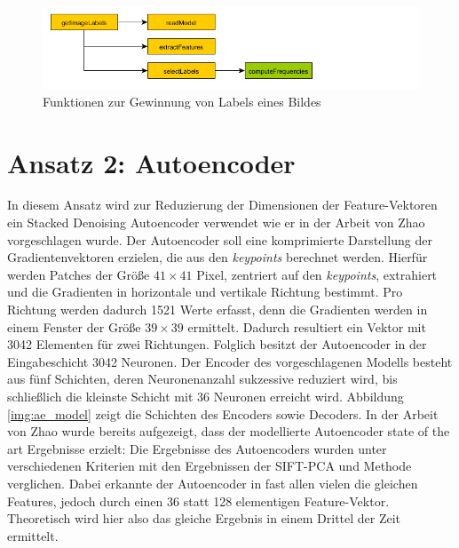 \begin{figure}
	\centering
	\includegraphics[scale=0.8]{images/concept_bovw_2.png}
	\caption{Funktionen zur Gewinnung von Labels eines Bildes}
	\label{img:concept_bovw_2}
\end{figure}

\section{Ansatz 2: Autoencoder}

In diesem Ansatz wird zur Reduzierung der Dimensionen der Feature-Vektoren ein Stacked Denoising Autoencoder verwendet wie er in der Arbeit von Zhao \cite{aed2016} vorgeschlagen wurde. Der Autoencoder soll eine komprimierte Darstellung der Gradientenvektoren erzielen, die aus den \textit{keypoints} berechnet werden. Hierfür werden Patches der Größe $41 \times 41$ Pixel, zentriert auf den \textit{keypoints}, extrahiert und die Gradienten in horizontale und vertikale Richtung bestimmt. Pro Richtung werden dadurch 1521 Werte erfasst, denn die Gradienten werden in einem Fenster der Größe $39 \times 39$ ermittelt. Dadurch resultiert ein Vektor mit 3042 Elementen für zwei Richtungen. Folglich besitzt der Autoencoder in der Eingabeschicht 3042 Neuronen. Der Encoder des vorgeschlagenen Modells besteht aus fünf Schichten, deren Neuronenanzahl sukzessive reduziert wird, bis schließlich die kleinste Schicht mit 36 Neuronen erreicht wird. Abbildung \ref{img:ae_model} zeigt die Schichten des Encoders sowie Decoders. In der Arbeit von Zhao wurde bereits aufgezeigt, dass der modellierte Autoencoder state of the art Ergebnisse erzielt: Die Ergebnisse des Autoencoders wurden unter verschiedenen Kriterien mit den Ergebnissen der SIFT-PCA und  Methode verglichen. Dabei erkannte der Autoencoder in fast allen vielen die gleichen Features, jedoch durch einen 36 statt 128 elementigen Feature-Vektor. Theoretisch wird hier also das gleiche Ergebnis in einem Drittel der Zeit ermittelt.


